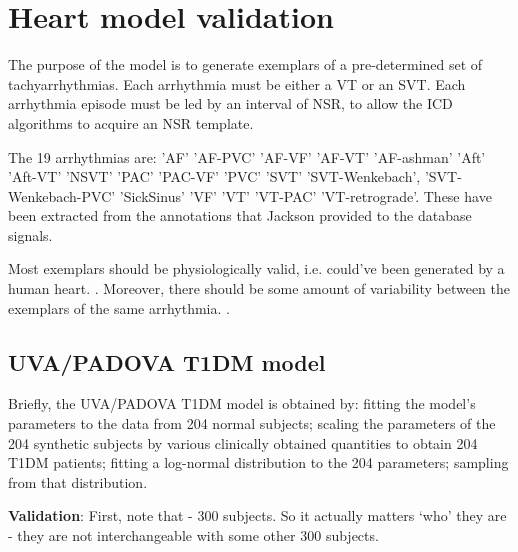 \section{Heart model validation}
\label{sec:heart model validation}

The purpose of the model is to generate exemplars of a pre-determined set of tachyarrhythmias.
Each arrhythmia must be either a VT or an SVT.
Each arrhythmia episode must be led by an interval of NSR, to allow the ICD algorithms to acquire an NSR template.

The 19 arrhythmias are:
'AF'    'AF-PVC'    'AF-VF'    'AF-VT'    'AF-ashman'    'Aft'    'Aft-VT'    'NSVT'    'PAC'    'PAC-VF'    'PVC'    'SVT'    'SVT-Wenkebach', 'SVT-Wenkebach-PVC'    'SickSinus'    'VF'    'VT'    'VT-PAC'    'VT-retrograde'.
These have been extracted from the annotations that Jackson provided to the database signals.

Most exemplars should be physiologically valid, i.e. could've been generated by a human heart.
. 
Moreover, there should be some amount of variability between the exemplars of the same arrhythmia.
.


\subsection{UVA/PADOVA T1DM model}
Briefly, the UVA/PADOVA T1DM model is obtained by: fitting the model's parameters to the data from 204 normal subjects;
scaling the parameters of the 204 synthetic subjects by various clinically obtained quantities to obtain 204 T1DM patients;
fitting a log-normal distribution to the 204 parameters;
sampling from that distribution.

\textbf{Validation}: First, note that  - 300 subjects.
So it actually matters `who' they are - they are not interchangeable with some other 300 subjects.

